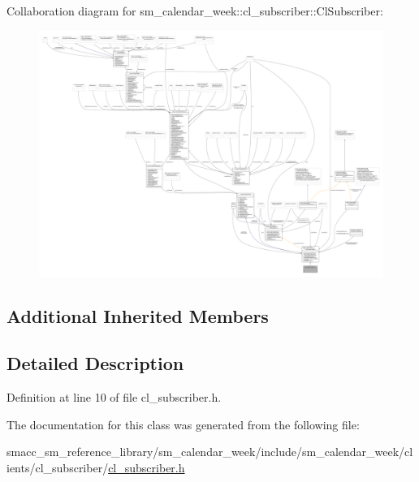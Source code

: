 Collaboration diagram for sm\+\_\+calendar\+\_\+week\+:\+:cl\+\_\+subscriber\+:\+:Cl\+Subscriber\+:
\nopagebreak
\begin{figure}[H]
\begin{center}
\leavevmode
\includegraphics[width=350pt]{classsm__calendar__week_1_1cl__subscriber_1_1ClSubscriber__coll__graph}
\end{center}
\end{figure}
\subsection*{Additional Inherited Members}


\subsection{Detailed Description}


Definition at line 10 of file cl\+\_\+subscriber.\+h.



The documentation for this class was generated from the following file\+:\begin{DoxyCompactItemize}
\item 
smacc\+\_\+sm\+\_\+reference\+\_\+library/sm\+\_\+calendar\+\_\+week/include/sm\+\_\+calendar\+\_\+week/clients/cl\+\_\+subscriber/\hyperlink{sm__calendar__week_2include_2sm__calendar__week_2clients_2cl__subscriber_2cl__subscriber_8h}{cl\+\_\+subscriber.\+h}\end{DoxyCompactItemize}
